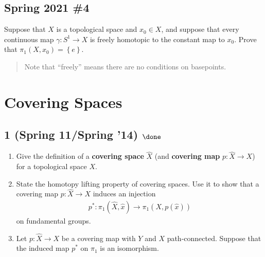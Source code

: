 \hypertarget{spring-2021-4}{%
\subsection{Spring 2021 \#4}\label{spring-2021-4}}

\begin{problem}[Spring 2021, 4]

Suppose that \(X\) is a topological space and \(x_0\in X\), and suppose
that every continuous map \(\gamma: S^1 \to X\) is freely homotopic to
the constant map to \(x_0\). Prove that
\(\pi_1(X, x_0) = \left\{{ e }\right\}\).

\begin{quote}
Note that ``freely'' means there are no conditions on basepoints.
\end{quote}

\end{problem}

\hypertarget{covering-spaces}{%
\section{Covering Spaces}\label{covering-spaces}}

\hypertarget{spring-11spring-14-done}{%
\subsection{\texorpdfstring{1 (Spring 11/Spring '14)
\(\done\)}{1 (Spring 11/Spring '14) \textbackslash done}}\label{spring-11spring-14-done}}

\begin{enumerate}
\def\labelenumi{\alph{enumi}.}
\item
  Give the definition of a \textbf{covering space} \(\widehat{X}\) (and
  \textbf{covering map} \(p : \widehat{X} \to X\)) for a topological
  space \(X\).
\item
  State the homotopy lifting property of covering spaces. Use it to show
  that a covering map \(p : \widehat{X} \to X\) induces an injection
  \begin{align*}
  p^\ast : \pi_1 (\widehat{X}, \widehat{x}) \to \pi_1 (X, p(\widehat{x}))
  \end{align*}
  on fundamental groups.
\item
  Let \(p : \widehat{X} \to X\) be a covering map with \(Y\) and \(X\)
  path-connected. Suppose that the induced map \(p^\ast\) on \(\pi_1\)
  is an isomorphism.
\end{enumerate}

